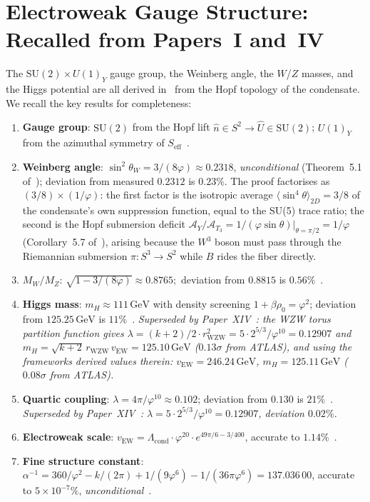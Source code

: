 \documentclass[11pt,a4paper]{article}
\theoremstyle{definition}
\theoremstyle{remark}
\newcommand{\vp}{\varphi}
\newcommand{\Lcond}{\Lambda_{\mathrm{cond}}}
\newcommand{\vEW}{v_{\mathrm{EW}}}
\newcommand{\sinW}{\sin^{2}\!\theta_{W}}
\begin{document}
\section{Electroweak Gauge Structure: Recalled from Papers~I and~IV}
\label{P7:sec:ew}

The $\mathrm{SU}(2)\times U(1)_Y$ gauge group, the Weinberg angle, the
$W$/$Z$ masses, and the Higgs potential are all derived in~\cite{Paper1}
from the Hopf topology of the condensate.  We recall the key results for
completeness:

\begin{enumerate}[noitemsep]
\item \textbf{Gauge group}: $\mathrm{SU}(2)$ from the Hopf lift
  $\hat{n}\in S^2\to\hat{U}\in\mathrm{SU}(2)$; $U(1)_Y$ from
  the azimuthal symmetry of $S_{\mathrm{eff}}$~\cite{Paper1}.
\item \textbf{Weinberg angle}: $\sinW=3/(8\vp)\approx0.2318$,
  \emph{unconditional} (Theorem~5.1 of~\cite{Paper1});
  deviation from measured $0.2312$ is $0.23\%$.
  The proof factorises as $(3/8)\times(1/\vp)$: the first factor is
  the isotropic average $\langle\sin^4\!\theta\rangle_{2D}=3/8$ of
  the condensate's own suppression function, equal to the SU(5) trace
  ratio; the second is the Hopf submersion deficit
  $\mathcal{A}_Y/\mathcal{A}_{T_3}=1/(\vp\sin\theta)|_{\theta=\pi/2}=1/\vp$
  (Corollary~5.7 of~\cite{Paper1}), arising because the $W^3$ boson
  must pass through the Riemannian submersion $\pi:S^3\to S^2$ while
  $B$ rides the fiber directly.
\item \textbf{$M_W/M_Z$}: $\sqrt{1-3/(8\vp)}\approx0.8765$;\
  deviation from $0.8815$ is $0.56\%$~\cite{Paper1}.
\item \textbf{Higgs mass}: $m_H\approx111\,\mathrm{GeV}$ with
  density screening $1+\beta\rho_0=\vp^2$; deviation from
  $125.25\,\mathrm{GeV}$ is $11\%$~\cite{Paper1}.
  \emph{Superseded by Paper~XIV~\cite{Paper14}: the WZW torus partition
  function gives $\lambda=(k+2)/2\cdot r_{\mathrm{WZW}}^2
  =5\cdot2^{5/3}/\vp^{10}=0.12907$ and
  $m_H=\sqrt{k+2}\,r_{\mathrm{WZW}}\,\vEW=125.10\,\mathrm{GeV}$
  ($0.13\sigma$ from ATLAS), and using the frameworks derived values therein:  $\vEW=246.24\,\mathrm{GeV}$, $m_H = 125.11\,\mathrm{GeV}$ ($0.08\sigma$ from ATLAS).}
\item \textbf{Quartic coupling}: $\lambda=4\pi/\vp^{10}\approx0.102$;
  deviation from $0.130$ is $21\%$~\cite{Paper1}.
  \emph{Superseded by Paper~XIV~\cite{Paper14}:
  $\lambda=5\cdot2^{5/3}/\vp^{10}=0.12907$, deviation $0.02\%$.}
\item \textbf{Electroweak scale}: $\vEW=\Lcond\cdot\vp^{20}\cdot
  e^{49\pi/6-3/400}$, accurate to $1.14\%$~\cite{Paper4}.
\item \textbf{Fine structure constant}: $\alpha^{-1}=360/\vp^2
  -k/(2\pi)+1/(9\vp^6)-1/(36\pi\vp^6)=137.036\,00$, accurate to $5\times10^{-7}\%$,
  \emph{unconditional}~\cite{Paper4}.
\end{enumerate}
\end{document}
